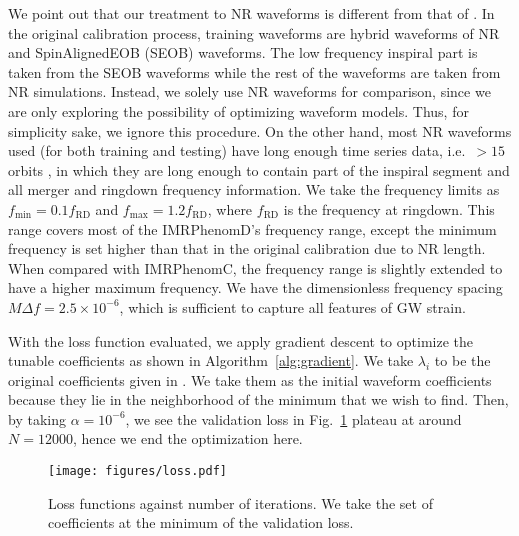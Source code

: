 \documentclass[twocolumn]{aastex631}
\newcommand{\te}[1]{{\color{rr}[TE: #1 ]}}
\begin{document}
We point out that our treatment to NR waveforms is different from that of \citep{husa2016frequency, khan2016frequency}. In the original calibration process, training waveforms are hybrid waveforms of NR and SpinAlignedEOB
(SEOB) waveforms. The low frequency inspiral part is taken from the SEOB
waveforms while the rest of the waveforms are taken from NR simulations.
Instead, we solely use NR waveforms for comparison, since we are only exploring the possibility of optimizing waveform models. Thus, for simplicity sake, we ignore this procedure. On the other hand, most NR waveforms used (for both training and testing) have long enough time series data, i.e.~$>15$ orbits \citep{boyle2019sxs}, in
which they are long enough to contain part of the inspiral segment and all
merger and ringdown frequency information. We take the frequency limits as
$f_{\mathrm{min}}=0.1f_{\mathrm{RD}}$ and $f_{\mathrm{max}}=1.2f_{\mathrm{RD}}$,	
where $f_{\mathrm{RD}}$ is the frequency at ringdown. This range covers most of
the IMRPhenomD's frequency range, except the minimum frequency is set higher
than that in the original calibration due to NR length. When compared with
IMRPhenomC, the frequency range is slightly extended to have a higher maximum
frequency. We have the dimensionless frequency spacing $M\Delta f=2.5\times10^{-6}$, 
which is sufficient to capture all features of GW strain. 

With the loss function evaluated, we apply gradient descent to optimize the tunable
coefficients as shown in Algorithm~\ref{alg:gradient}. We take $\lambda_i$ to be the 
original coefficients given in \citep{khan2016frequency}. We take them as the initial 
waveform coefficients because they lie in the neighborhood of the minimum that we wish 
to find. Then, by taking $\alpha=10^{-6}$, we see the validation loss in 
Fig.~\ref{fig:loss} plateau at around $N=12000$, hence we end the optimization here.  

\begin{figure}
	\centering
	\texttt{[image: figures/loss.pdf]}
	\caption{Loss functions against number of iterations. We take the set of coefficients at the minimum of the validation loss.}
	\label{fig:loss}
\end{figure}
\end{document}
